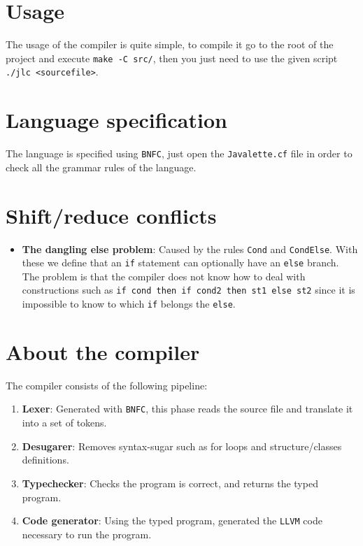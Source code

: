 \documentclass{article}
\begin{document}
\section{Usage}
The usage of the compiler is quite simple, to compile it go to the root of the project and execute \texttt{make -C src/}, then you just need to use the given script \texttt{./jlc <sourcefile>}.

\section{Language specification}
The language is specified using \texttt{BNFC}, just open the \texttt{Javalette.cf} file in order to check all the grammar rules of the language.

\section{Shift/reduce conflicts}

\begin{itemize}
  \item {\bf The dangling else problem}: Caused by the rules \texttt{Cond} and \texttt{CondElse}. With these we define that an \texttt{if} statement can optionally have an \texttt{else} branch. The problem is that the compiler does not know how to deal with constructions such as \texttt{if cond then if cond2 then st1 else st2} since it is impossible to know to which \texttt{if} belongs the \texttt{else}.
\end{itemize}

\section{About the compiler}

The compiler consists of the following pipeline:

\begin{enumerate}
 \item {\bf Lexer}: Generated with \texttt{BNFC}, this phase reads the source file and translate it into a set of tokens.
 \item {\bf Desugarer}: Removes syntax-sugar such as for loops and structure/classes definitions.
 \item {\bf Typechecker}: Checks the program is correct, and returns the typed program.
 \item {\bf Code generator}: Using the typed program, generated the \texttt{LLVM} code necessary to run the program.
\end{enumerate}
\end{document}
